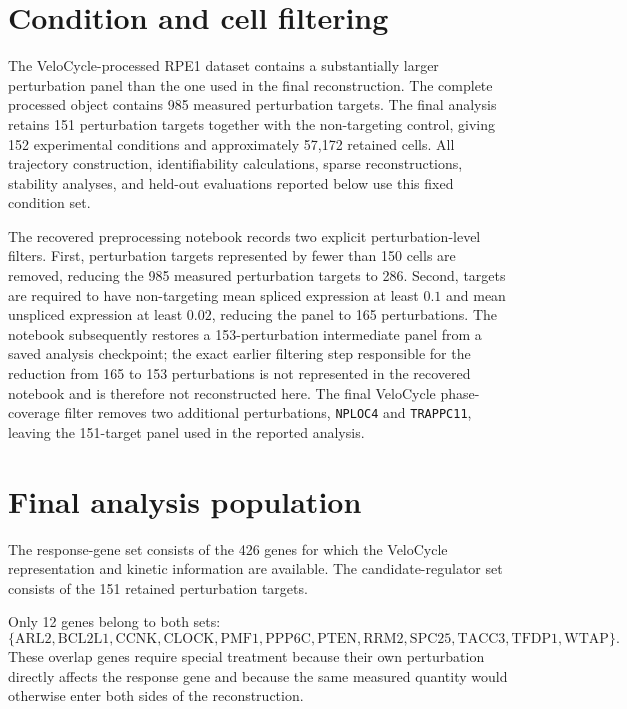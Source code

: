 \documentclass[supplement,onefignum,onetabnum]{siamart251216}
\begin{document}
\section{Condition and cell filtering}

The VeloCycle-processed RPE1 dataset contains a substantially larger perturbation panel than the one used in the final reconstruction. The complete processed object contains 985 measured perturbation targets. The final analysis retains 151 perturbation targets together with the non-targeting control, giving 152 experimental conditions and approximately 57,172 retained cells. All trajectory construction, identifiability calculations, sparse reconstructions, stability analyses, and held-out evaluations reported below use this fixed condition set.

The recovered preprocessing notebook records two explicit perturbation-level filters. First, perturbation targets represented by fewer than 150 cells are removed, reducing the 985 measured perturbation targets to 286. Second, targets are required to have non-targeting mean spliced expression at least \(0.1\) and mean unspliced expression at least \(0.02\), reducing the panel to 165 perturbations. The notebook subsequently restores a 153-perturbation intermediate panel from a saved analysis checkpoint; the exact earlier filtering step responsible for the reduction from 165 to 153 perturbations is not represented in the recovered notebook and is therefore not reconstructed here. The final VeloCycle phase-coverage filter removes two additional perturbations, \texttt{NPLOC4} and \texttt{TRAPPC11}, leaving the 151-target panel used in the reported analysis.

\section{Final analysis population}

The response-gene set consists of the 426 genes for which the VeloCycle representation and kinetic information are available. The candidate-regulator set consists of the 151 retained perturbation targets.

Only 12 genes belong to both sets:
\[
\{\mathrm{ARL2},\mathrm{BCL2L1},\mathrm{CCNK},\mathrm{CLOCK},\mathrm{PMF1},\mathrm{PPP6C},\mathrm{PTEN},\mathrm{RRM2},\mathrm{SPC25},\mathrm{TACC3},\mathrm{TFDP1},\mathrm{WTAP}\}.
\]
These overlap genes require special treatment because their own perturbation directly affects the response gene and because the same measured quantity would otherwise enter both sides of the reconstruction.
\end{document}
